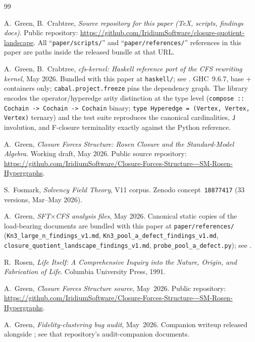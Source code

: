\documentclass[12pt,a4paper]{article}
\theoremstyle{definition}
\theoremstyle{remark}
\newcommand{\Jconj}{\mathsf{J}}             %
\begin{document}
\begin{thebibliography}{99}

 A.~Green, B.~Crabtree,
\emph{Source repository for this paper (TeX, scripts, findings docs)}.
Public repository:
\url{https://github.com/IridiumSoftware/closure-quotient-landscape}.
All ``\texttt{paper/scripts/}'' and ``\texttt{paper/references/}''
references in this paper are paths inside the released bundle at
that URL.

 A.~Green, B.~Crabtree,
\emph{cfs-kernel: Haskell reference port of the CFS rewriting kernel},
May 2026. Bundled with this paper at \texttt{haskell/}; see
\cite{paper-source}. GHC~9.6.7, base + containers only;
\texttt{cabal.project.freeze} pins the dependency graph. The library
encodes the operator/hyperedge arity distinction at the type level
(\texttt{compose :: Cochain -> Cochain -> Cochain} binary;
\texttt{type Hyperedge = (Vertex, Vertex, Vertex)} ternary) and the
test suite reproduces the canonical cardinalities, $\Jconj$
involution, and F-closure terminality exactly against the Python
reference.

 A.~Green,
\emph{Closure Forces Structure: Rosen Closure and the Standard-Model Algebra}.
Working draft, May 2026.
Public source repository:
\url{https://github.com/IridiumSoftware/Closure-Forces-Structure---SM-Rosen-Hypergraphs}.

 S.~Fosmark,
\emph{Solvency Field Theory}, V11 corpus.
Zenodo concept~\texttt{18877417} (33 versions, Mar--May 2026).

 A.~Green,
\emph{SFT$\times$CFS analysis files}, May 2026.
Canonical static copies of the load-bearing documents are bundled
with this paper at \texttt{paper/references/}
(\texttt{Kn3\_large\_n\_findings\_v1.md},
\texttt{Kn3\_pool\_a\_defect\_findings\_v1.md},
\texttt{closure\_quotient\_landscape\_findings\_v1.md},
\texttt{probe\_pool\_a\_defect.py}); see \cite{paper-source}.

 R.~Rosen,
\emph{Life Itself: A Comprehensive Inquiry into the Nature, Origin, and Fabrication of Life}.
Columbia University Press, 1991.

 A.~Green,
\emph{Closure Forces Structure source}, May~2026.
Public repository:
\url{https://github.com/IridiumSoftware/Closure-Forces-Structure---SM-Rosen-Hypergraphs}.

 A.~Green,
\emph{Fidelity-clustering bug audit}, May~2026.
Companion writeup released alongside \cite{CFS2026}; see that
repository's audit-companion documents.


\end{thebibliography}
\end{document}
